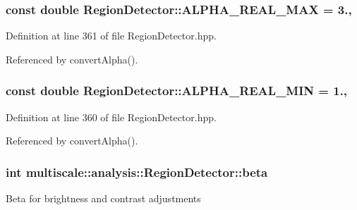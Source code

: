 \hypertarget{classmultiscale_1_1analysis_1_1RegionDetector_abc853d2cfef9e4fafbf86715b48495e0}{
\subsubsection[{A\-L\-P\-H\-A\-\_\-\-R\-E\-A\-L\-\_\-\-M\-A\-X}]{\setlength{\rightskip}{0pt plus 5cm}const double Region\-Detector\-::\-A\-L\-P\-H\-A\-\_\-\-R\-E\-A\-L\-\_\-\-M\-A\-X = 3.\hspace{0.3cm}{\ttfamily [static]}, {\ttfamily [private]}}}\label{classmultiscale_1_1analysis_1_1RegionDetector_abc853d2cfef9e4fafbf86715b48495e0}


Definition at line 361 of file Region\-Detector.\-hpp.



Referenced by convert\-Alpha().

\hypertarget{classmultiscale_1_1analysis_1_1RegionDetector_a4a11aa86a5250ca6197589c4ccb770f6}{
\subsubsection[{A\-L\-P\-H\-A\-\_\-\-R\-E\-A\-L\-\_\-\-M\-I\-N}]{\setlength{\rightskip}{0pt plus 5cm}const double Region\-Detector\-::\-A\-L\-P\-H\-A\-\_\-\-R\-E\-A\-L\-\_\-\-M\-I\-N = 1.\hspace{0.3cm}{\ttfamily [static]}, {\ttfamily [private]}}}\label{classmultiscale_1_1analysis_1_1RegionDetector_a4a11aa86a5250ca6197589c4ccb770f6}


Definition at line 360 of file Region\-Detector.\-hpp.



Referenced by convert\-Alpha().

\hypertarget{classmultiscale_1_1analysis_1_1RegionDetector_a23c831170c2264dd7e59067a1a7d3c8e}{
\subsubsection[{beta}]{\setlength{\rightskip}{0pt plus 5cm}int multiscale\-::analysis\-::\-Region\-Detector\-::beta\hspace{0.3cm}{\ttfamily [private]}}}\label{classmultiscale_1_1analysis_1_1RegionDetector_a23c831170c2264dd7e59067a1a7d3c8e}
Beta for brightness and contrast adjustments 

